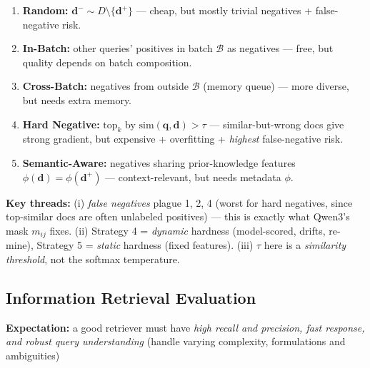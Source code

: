 \documentclass{article}
\begin{document}
\begin{enumerate}
    \item \textbf{Random:} $\mathbf{d}^- \sim D\setminus\{\mathbf{d}^+\}$ — cheap, but mostly trivial negatives + false-negative risk.
    \item \textbf{In-Batch:} other queries' positives in batch $\mathcal{B}$ as negatives — free, but quality depends on batch composition.
    \item \textbf{Cross-Batch:} negatives from outside $\mathcal{B}$ (memory queue) — more diverse, but needs extra memory.
    \item \textbf{Hard Negative:} $\text{top}_k$ by $\text{sim}(\mathbf{q},\mathbf{d})>\tau$ — similar-but-wrong docs give strong gradient, but expensive + overfitting + \emph{highest} false-negative risk.
    \item \textbf{Semantic-Aware:} negatives sharing prior-knowledge features $\phi(\mathbf{d})=\phi(\mathbf{d}^+)$ — context-relevant, but needs metadata $\phi$.
\end{enumerate}

\noindent\textbf{Key threads:} (i) \emph{false negatives} plague 1, 2, 4 (worst for hard negatives, since top-similar docs are often unlabeled positives) — this is exactly what Qwen3's mask $m_{ij}$ fixes. (ii) Strategy 4 = \emph{dynamic} hardness (model-scored, drifts, re-mine), Strategy 5 = \emph{static} hardness (fixed features). (iii) $\tau$ here is a \emph{similarity threshold}, not the softmax temperature.

\subsection{Information Retrieval Evaluation}
\textbf{Expectation:} a good retriever must have \textit{high recall and precision, fast response, and robust query understanding} (handle varying complexity, formulations and ambiguities)
\end{document}

